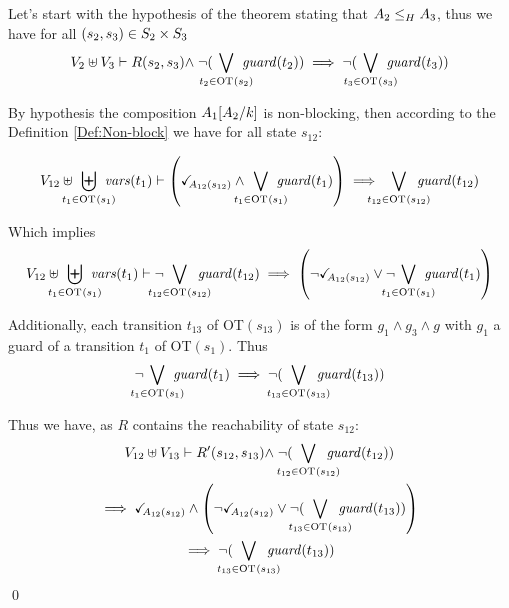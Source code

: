\documentclass[runningheads]{llncs}
\begin{document}
\begin{enumerate}
Let's start  with the hypothesis of the theorem stating that $\wrel{A_2}{A_3}{H}$, thus we have for all  $\mpar{s_2, s_3} \in S_2 \times S_3$ 
\begin{multline*}
V_2 \uplus V_3  \vdash R\mpar{s_2, s_3} \nwedge \neg (\bigvee_\subbox{t_2 \in \fOT{s_2}} \fguard{t_2}) \implies   \neg(\bigvee_\subbox{t_3 \in \fOT{s_3}} \fguard{t_3})
\end{multline*}

By hypothesis  the composition  \(A_1\subst{A_2}{k}\) is non-blocking,  then according to the Definition \ref{Def:Non-block} we have for all state $s_{12}$: 


\begin{multline*}
V_{12} \uplus \biguplus_\subbox{t_1 \in \fOT{s_1}} \fvars{t_1}  \vdash  \left(\reach{A_{12}(s_{12})} \land \bigvee_\subbox{t_1 \in \fOT{s_1}} \fguard{t_1}\right) \implies \bigvee_\subbox{t_{12} \in \fOT{s_{12}}} \fguard{t_{12}}
\end{multline*}

Which implies 
\begin{multline*}
V_{12} \uplus \biguplus_\subbox{t_1 \in \fOT{s_1}} \fvars{t_1}  \vdash 
\neg{ \bigvee_\subbox{t_{12} \in \fOT{s_{12}}} \fguard{t_{12}}}
\implies 
\left(\neg{\reach{A_{12}(s_{12})} }\lor \neg{\bigvee_\subbox{t_1 \in \fOT{s_1}} \fguard{t_1}}
\right)
\end{multline*}

Additionally, each transition $t_{13}$ of OT$(s_{13})$ is of the form $
g_1\land g_3 \land g$ with $g_1$ a guard of a transition $t_{1}$ of OT$(s_{1})$.
Thus 
\[
\neg{\bigvee_\subbox{t_1 \in \fOT{s_1}} \fguard{t_1}}  \implies \neg (\bigvee_\subbox{t_{13} \in \fOT{s_{13}}} \fguard{t_{13}}) \]

Thus we have, as $R$ contains the reachability of state $s_{12}$:
\begin{multline*}
V_{12} \uplus V_{13}  \vdash  R'\mpar{s_{12}, s_{13}} \nwedge  \neg(\bigvee_\subbox{t_{12} \in \fOT{s_{12}}} \fguard{t_{12}}) \\
\implies \reach{A_{12}(s_{12})} \land \left(\neg{\reach{A_{12}(s_{12})} }\lor
\neg (\bigvee_\subbox{t_{13} \in \fOT{s_{13}}} \fguard{t_{13}})\right) \\
\implies
\neg (\bigvee_\subbox{t_{13} \in \fOT{s_{13}}} \fguard{t_{13}})
\end{multline*}
\qed

\end{enumerate}

\newpage
\end{document}
